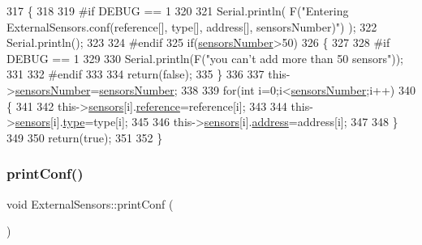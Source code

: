 \begin{DoxyCode}
317 \{
318 
319 \textcolor{preprocessor}{#if DEBUG == 1}
320 
321     Serial.println( F(\textcolor{stringliteral}{"Entering ExternalSensors.conf(reference[], type[], address[], sensorsNumber)"}) );
322     Serial.println();
323 
324 \textcolor{preprocessor}{#endif  }
325     \textcolor{keywordflow}{if}(\hyperlink{class_external_sensors_a58e4fbf9adeae787d92be5fa33043b5d}{sensorsNumber}>50)
326     \{
327     
328 \textcolor{preprocessor}{    #if DEBUG == 1}
329     
330         Serial.println(F(\textcolor{stringliteral}{"you can't add more than 50 sensors"}));    
331     
332 \textcolor{preprocessor}{    #endif  }
333     
334         \textcolor{keywordflow}{return}(\textcolor{keyword}{false});
335     \}
336 
337     this->\hyperlink{class_external_sensors_a58e4fbf9adeae787d92be5fa33043b5d}{sensorsNumber}=\hyperlink{class_external_sensors_a58e4fbf9adeae787d92be5fa33043b5d}{sensorsNumber};
338     
339     \textcolor{keywordflow}{for}(\textcolor{keywordtype}{int} i=0;i<\hyperlink{class_external_sensors_a58e4fbf9adeae787d92be5fa33043b5d}{sensorsNumber};i++)
340     \{
341     
342         this->\hyperlink{class_external_sensors_a284233f884fcf00154a44740cf1d9e1e}{sensors}[i].\hyperlink{struct_external_sensors_1_1sensor_afed5bdfd49732202a368b600cb8396fe}{reference}=reference[i];
343         
344         this->\hyperlink{class_external_sensors_a284233f884fcf00154a44740cf1d9e1e}{sensors}[i].\hyperlink{struct_external_sensors_1_1sensor_a6acfdb02c742c2110d7bd2b5d9fce9e7}{type}=type[i];
345 
346         this->\hyperlink{class_external_sensors_a284233f884fcf00154a44740cf1d9e1e}{sensors}[i].\hyperlink{struct_external_sensors_1_1sensor_a8d70ca58524521ed054fc6b81eb58d34}{address}=address[i];
347     
348     \}
349     
350     \textcolor{keywordflow}{return}(\textcolor{keyword}{true});
351 
352 \}
\end{DoxyCode}
\mbox{\label{class_external_sensors_a78c2bf55084435dd51d3c559b2d3c6f3}} 
\subsubsection{\texorpdfstring{print\+Conf()}{printConf()}}
{\footnotesize\ttfamily void External\+Sensors\+::print\+Conf (\begin{DoxyParamCaption}{ }\end{DoxyParamCaption})}


